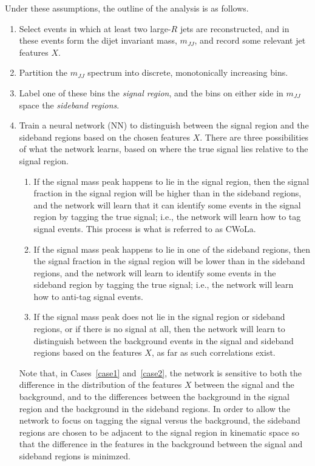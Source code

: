 Under these assumptions, the outline of the analysis is as follows.
\begin{enumerate}
  \item Select events in which at least two large-$R$ jets are reconstructed, and in these events form the dijet invariant mass, $m_{JJ}$, and record some relevant jet features $X$.\label{step1}
  \item Partition the $m_{JJ}$ spectrum into discrete, monotonically increasing bins.\label{step2}
  \item Label one of these bins the \textit{signal region}, and the bins on either side in $m_{JJ}$ space the \textit{sideband regions}.~\label{step3}
  \item Train a neural network (NN) to distinguish between the signal region and the sideband regions based on the chosen features $X$.
    There are three possibilities of what the network learns, based on where the true signal lies relative to the signal region.
    \begin{enumerate}
      \item If the signal mass peak happens to lie in the signal region, then the signal fraction in the signal region will be higher than in the sideband regions, and the network will learn that it can identify some events in the signal region by tagging the true signal; i.e., the network will learn how to tag signal events.
        This process is what is referred to as CWoLa.\label{case1}
      \item If the signal mass peak happens to lie in one of the sideband regions, then the signal fraction in the signal region will be lower than in the sideband regions, and the network will learn to identify some events in the sideband region by tagging the true signal; i.e., the network will learn how to anti-tag signal events.\label{case2}
      \item If the signal mass peak does not lie in the signal region or sideband regions, or if there is no signal at all, then the network will learn to distinguish between the background events in the signal and sideband regions based on the features $X$, as far as such correlations exist.\label{case3}
    \end{enumerate}
    Note that, in Cases~\ref{case1} and~\ref{case2}, the network is sensitive to both the difference in the distribution of the features $X$ between the signal and the background, and to the differences between the background in the signal region and the background in the sideband regions.
    In order to allow the network to focus on tagging the signal versus the background, the sideband regions are chosen to be adjacent to the signal region in kinematic space so that the difference in the features in the background between the signal and sideband regions is minimzed.

\end{enumerate}
